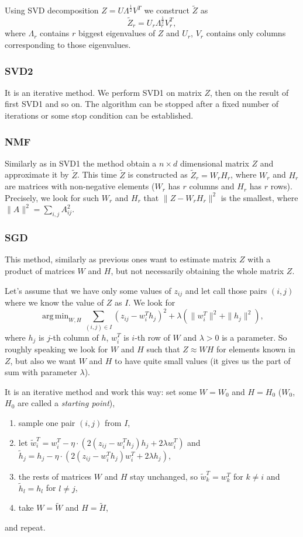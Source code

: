 \documentclass[10pt]{amsart}
\DeclareMathOperator*{\argmin}{arg\,min}
\begin{document}
Using SVD decomposition $Z = U \Lambda^{\frac{1}{2}} V^T$ we construct $\tilde{Z}$ as
\[\tilde{Z}_r = U_r \Lambda_r^{\frac{1}{2}}V_r^T,\]
where $\Lambda_r$ contains $r$ biggest eigenvalues of $Z$ and $U_r$, $V_r$ contains only columns corresponding to those eigenvalues.

\subsubsection*{SVD2}

It is an iterative method.
We perform SVD1 on matrix $Z$, then on the result of first SVD1 and so on.
The algorithm can be stopped after a fixed number of iterations or some stop condition can be established.


\subsubsection*{NMF}

Similarly as in SVD1 the method obtain a $n \times d$ dimensional matrix $Z$ and approximate it by $\tilde{Z}$.
This time $\tilde{Z}$ is constructed as $\tilde{Z}_r = W_r H_r $, where $W_r$ and $H_r$ are matrices with non-negative elements ($W_r$ has $r$ columns and $H_r$ has $r$ rows).
Precisely, we look for such $W_r$ and $H_r$ that $\|Z - W_r H_r \|^2$ is the smallest, where $\|A\|^2 = \sum_{i, j} A_{ij}^2$.

\subsubsection*{SGD}

This method, similarly as previous ones want to estimate matrix $Z$ with a product of matrices
$W$ and $H$, but not necessarily obtaining the whole matrix $Z$.

Let's assume that we have only some values of $z_{ij}$ and let call those pairs $(i,j)$ where we know the value of $Z$ as $I$.
We look for
\[\argmin_{W, H} \sum_{(i,j)\in I} (z_{ij} - w_i^T h_j)^2 + \lambda(\|w_i^T\|^2 + \|h_j\|^2),\]
where $h_j$ is $j$-th column of $h$, $w_i^T$ is $i$-th row of $W$ and $\lambda > 0$ is a parameter.
So roughly speaking we look for $W$ and $H$ such that $Z \approx WH$ for elements known in $Z$, but also we want $W$ and $H$ to have quite small values (it gives us the part of sum with parameter $\lambda$).

It is an iterative method and work this way: set some $W = W_0$ and $H = H_0$ ($W_0$, $H_0$ are called a \textit{starting point}),
\begin{enumerate}
    \item sample one pair $(i,j)$ from $I$,
    \item let $\tilde{w}_i^T = w_i^T - \eta \cdot \left(2(z_{ij} - w_i^T h_j) h_j + 2 \lambda w_i^T \right)$ and $\tilde{h}_j = h_j - \eta \cdot \left(2(z_{ij} - w_i^T  h_{j}) w_i^T + 2 \lambda h_j \right)$,
    \item the rests of matrices $W$ and $H$ stay unchanged, so $\tilde{w}_k^T = w_k^T$ for $k \neq i$ and $\tilde{h}_l = h_l$ for $l \neq j$,
    \item take $W = \tilde{W}$ and $H = \tilde{H}$,
\end{enumerate}
and repeat.
\end{document}
